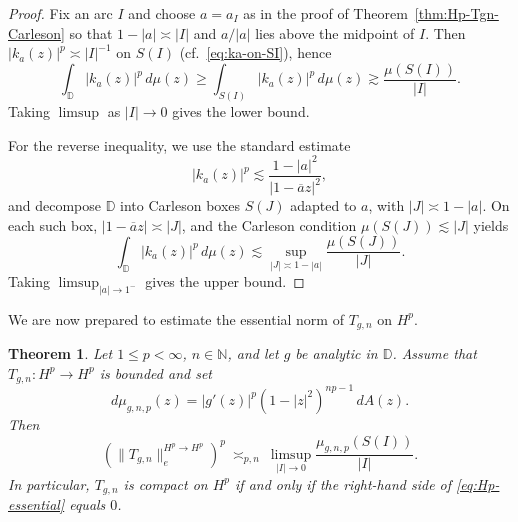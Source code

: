 \documentclass[preprint,12pt]{elsarticle}
\numberwithin{equation}{section}
\newtheorem{theorem}{Theorem}[section]
\theoremstyle{remark}
\begin{document}
\begin{proof}
Fix an arc $I$ and choose $a=a_I$ as in the proof of Theorem~\ref{thm:Hp-Tgn-Carleson} so that $1-|a|\asymp |I|$ and $a/|a|$ lies above the midpoint of $I$. Then
$|k_a(z)|^p\asymp |I|^{-1}$ on $S(I)$ (cf.\ \eqref{eq:ka-on-SI}), hence
\begin{equation*}
\int_{\mathbb D}|k_a(z)|^p\,d\mu(z)
\ge \int_{S(I)}|k_a(z)|^p\,d\mu(z)
\gtrsim \frac{\mu(S(I))}{|I|}.
\end{equation*}
Taking $\limsup$ as $|I|\to 0$ gives the lower bound.

For the reverse inequality, we use the standard estimate
\begin{equation*}
|k_a(z)|^p\lesssim \frac{1-|a|^2}{|1-\overline a z|^2},
\end{equation*}
and decompose $\mathbb D$ into Carleson boxes $S(J)$ adapted to $a$, with $|J|\asymp 1-|a|$.
On each such box, $|1-\overline a z|\asymp |J|$, and the Carleson condition $\mu(S(J))\lesssim |J|$
yields
\begin{equation*}
\int_{\mathbb D}|k_a(z)|^p\,d\mu(z)
\lesssim \sup_{|J|\asymp 1-|a|}\frac{\mu(S(J))}{|J|}.
\end{equation*}
Taking $\limsup_{|a|\to 1^-}$ gives the upper bound.
\end{proof}

We are now prepared to estimate the essential norm of $ T_{g,n} $ on $ H^p $.
\begin{theorem}\label{thm:Hp-essential-norm}
Let $1\le p<\infty$, $n\in\mathbb N$, and let $g$ be analytic in $\mathbb D$.
Assume that $T_{g,n}:H^p\to H^p$ is bounded and set
\begin{equation*}
d\mu_{g,n,p}(z)=|g'(z)|^p(1-|z|^2)^{np-1}\,dA(z).
\end{equation*}
Then
\begin{equation}\label{eq:Hp-essential}
\left(\|T_{g,n}\|_{e}^{H^p\to H^p}\right)^p
\ \asymp_{p,n}\
\limsup_{|I|\to 0}\frac{\mu_{g,n,p}(S(I))}{|I|}.
\end{equation}
In particular, $T_{g,n}$ is compact on $H^p$ if and only if the right-hand side of
\eqref{eq:Hp-essential} equals $0$.
\end{theorem}
\end{document}
